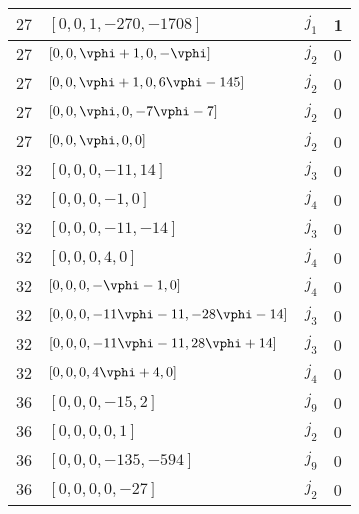\documentclass{amsart}
\begin{document}
\begin{center}
\begin{table}[h]
\begin{tabular}{|c|l|l|l|}
$27$ & $\left[0, 0, 1, -270, -1708\right]$ & $j_1$ & 1\\\hline %
$27$ & $\left[0, 0, \vphi + 1, 0, -\vphi \right]$ & $j_2$& 0 \\\hline %
$27$ & $\left[0, 0, \vphi + 1, 0, 6\vphi - 145\right]$ & $j_2$ & 0\\\hline %
$27$ & $\left[0, 0, \vphi, 0, -7\vphi - 7\right]$ & $j_2$ & 0 \\\hline %
$27$ & $\left[0, 0, \vphi, 0, 0\right]$ & $j_2$ & 0 \\\hline %
$32$ & $\left[0, 0, 0, -11, 14\right]$ & $j_3$& 0 \\\hline %
$32$ & $\left[0, 0, 0, -1, 0\right]$ & $j_4$ & 0 \\\hline %
$32$ & $\left[0, 0, 0, -11, -14\right]$ & $j_3$ & 0 \\\hline %
 $32$ & $\left[0, 0, 0, 4, 0\right]$ & $j_4$ & 0 \\\hline %
$32$ & $\left[0, 0, 0, -\vphi - 1, 0\right]$ & $j_4$ & 0 \\\hline %
$32$ & $\left[0, 0, 0, -11\vphi - 11, -28\vphi - 14\right]$ & $j_3$ & 0\\\hline %
$32$ & $\left[0, 0, 0, -11\vphi - 11, 28\vphi + 14\right]$ & $j_3$& 0 \\\hline %
$32$ & $\left[0, 0, 0, 4\vphi + 4, 0\right]$ & $j_4$ & 0\\\hline %
$36$ & $\left[0, 0, 0, -15, 2\right]$ & $j_9$& 0 \\\hline %
$36$ & $\left[0, 0, 0, 0, 1\right]$ & $j_2$ & 0 \\\hline %
$36$ & $\left[0, 0, 0, -135, -594\right]$ & $j_9$ & 0 \\\hline %
$36$ & $\left[0, 0, 0, 0, -27\right]$ & $j_2$ & 0 \\\hline %
\end{tabular}
\end{table}
\end{center}




 

\end{document}
